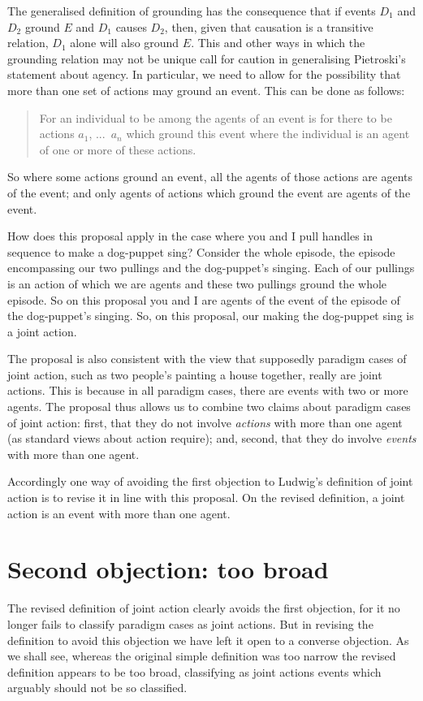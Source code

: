\documentclass[12pt,a4paper]{extarticle}
\begin{document}
The generalised definition of grounding has the consequence that if events $D_1$ and $D_2$ ground  $E$ and $D_1$ causes $D_2$, then, given that causation is a transitive relation, $D_1$ alone will also ground $E$.
This and other ways in which the grounding relation may not be unique call for caution in generalising Pietroski's statement about agency.
In particular, we need to allow for the possibility that more than one set of actions may ground an event.
This can be done as follows:
%
\begin{quote}
For an individual to be among the agents of an event is for there to be actions $a_1$, ...\ $a_n$ which ground this event where the individual is an agent of one or more of these actions.
\end{quote}
%
So where some actions ground an event, all the agents of those actions are agents of the event; and only agents of actions which ground the event are agents of the event.

How does this proposal apply in the case where you and I pull handles in sequence to make a dog-puppet sing?
Consider the whole episode, the episode encompassing our two pullings and the dog-puppet's singing.
Each of our pullings is an action of which we are agents
and these two pullings ground the whole episode.
So on this proposal you and I are agents of the event of the episode of the dog-puppet's singing. 
So, on this proposal, our making the dog-puppet sing is a joint action.

The proposal is also consistent with the view that supposedly paradigm cases of joint action, such as two people's painting a house together, really are joint actions.
This is because in all paradigm cases, there are events with two or more agents.
The proposal thus allows us to combine two claims about paradigm cases of joint action: first, that they do not involve \emph{actions} with more than one agent (as standard views about action require); and, second, that they do involve \emph{events} with more than one agent.

Accordingly one way of avoiding the first objection to Ludwig's definition of joint action is to revise it in line with this proposal.  
On the revised definition, a joint action is an event with more than one agent.


\section{Second objection: too broad}
The revised definition of joint action clearly avoids the first objection, for it no longer fails to classify paradigm cases as joint actions.
But in revising the definition to avoid this objection we have left it open to a converse objection.
As we shall see, 
whereas the original simple definition was too narrow
the revised definition appears to be too broad, classifying as joint actions events which arguably should not be so classified.
\end{document}
